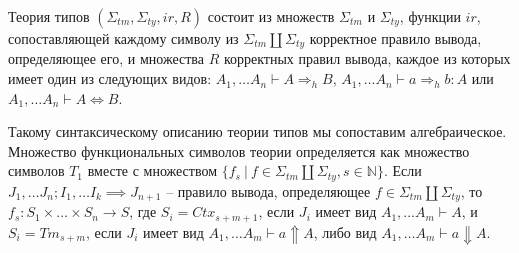 \documentclass{amsart}
\theoremstyle{definition}
\theoremstyle{remark}
\newcommand{\red}{\Rightarrow}
\newcommand{\deq}{\Leftrightarrow}
\newcommand{\cat}[1]{\mathbf{#1}}
\newcommand{\Set}{\cat{Set}}
\numberwithin{figure}{section}
\begin{document}
Теория типов $(\Sigma_{tm}, \Sigma_{ty}, ir, R)$ состоит из множеств $\Sigma_{tm}$ и $\Sigma_{ty}$, функции $ir$, сопоставляющей каждому символу из $\Sigma_{tm} \amalg \Sigma_{ty}$ корректное правило вывода, определяющее его, и множества $R$ корректных правил вывода, каждое из которых имеет один из следующих видов: $A_1, \ldots A_n \vdash A \red_h B$, $A_1, \ldots A_n \vdash a \red_h b : A$ или $A_1, \ldots A_n \vdash A \deq B$.

Такому синтаксическому описанию теории типов мы сопоставим алгебраическое.
Множество функциональных символов теории определяется как множество символов $T_1$ вместе с множеством $\{ f_s\ |\ f \in \Sigma_{tm} \amalg \Sigma_{ty}, s \in \mathbb{N} \}$.
Если $J_1, \ldots J_n; I_1, \ldots I_k \implies J_{n+1}$ -- правило вывода, определяющее $f \in \Sigma_{tm} \amalg \Sigma_{ty}$, то $f_s : S_1 \times \ldots \times S_n \to S$, где $S_i = Ctx_{s+m+1}$, если $J_i$ имеет вид $A_1, \ldots A_m \vdash A$, и $S_i = Tm_{s+m}$, если $J_i$ имеет вид $A_1, \ldots A_m \vdash a \Uparrow A$, либо вид $A_1, \ldots A_m \vdash a \Downarrow A$.

\begin{comment}
В \cite{c-systems-monad} приводится конструкция, сопоставляющая синтаксическому представлению теории типов ее синтаксическую контекстуальную категорию.
В этом разделе мы введем обобщение этой конструкции, которая синтаксическому представлению сопоставляет алгебраическое.
Синтаксическая категория тогда может быть восстановлена как начальная модель этой теории.

Пусть $T : \Set \to \Set$ -- финитарный функтор, $\widetilde{T} : \Set \to \Set$ -- свободная монада над $T$, и $M : \Set \to \Set$ -- левый модуль над $\widetilde{T}$.
Пусть $Ctx, Tm, Eq, eq : \Set \to \Set$ -- следующие функторы:
\[ Ctx(X) = \coprod\limits_{n \geq 0} \prod_{0 \leq i < n} M(X \amalg \{ 1, \ldots i \}) \]
\[ Tm(X) = \coprod\limits_{n \geq 0} \prod_{0 \leq i < n} M(X \amalg \{ 1, \ldots i \}) \times \widetilde{T}(X \amalg \{ 1, \ldots i \}) \times M(X \amalg \{ 1, \ldots i \}) \]
\[ Eq(X) = \coprod\limits_{n \geq 0} \prod_{0 \leq i < n} M(X \amalg \{ 1, \ldots i \}) \times M(X \amalg \{ 1, \ldots i \})^2 \]
\[ eq(X) = \coprod\limits_{n \geq 0} \prod_{0 \leq i < n} M(X \amalg \{ 1, \ldots i \}) \times \widetilde{T}(X \amalg \{ 1, \ldots i \})^2 \times M(X \amalg \{ 1, \ldots i \}) \]
Синтаксическое представление теории типов состоит из финитарного функтора $T$, левого модуля $M$ над $\widetilde{T}$ и подфункторов $Ctx', Tm', Eq', eq' : \Set \to \Set$ функторов $Ctx$, $Tm$, $Eq$ и $eq$ соответственно.
\end{comment}



\end{document}
